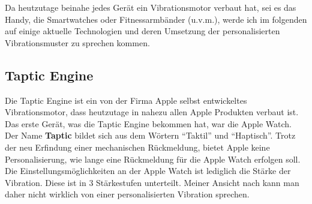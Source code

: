 
Da heutzutage beinahe jedes Ger{\"a}t ein Vibrationsmotor verbaut hat, sei es das Handy, die Smartwatches oder Fitnessarmb{\"a}nder (u.v.m.), werde ich im folgenden auf einige aktuelle Technologien und deren Umsetzung der personalisierten Vibrationsmuster zu sprechen kommen. 

\subsection{Taptic Engine}
\label{ch:Grundlagen:sec:RelatedWork:subsec:TapticEngine}

Die Taptic Engine ist ein von der Firma Apple selbst entwickeltes Vibrationsmotor, dass heutzutage in nahezu allen Apple Produkten verbaut ist. Das erste Ger{\"a}t, was die Taptic Engine bekommen hat, war die Apple Watch. Der Name \textbf{Taptic} bildet sich aus dem W{\"o}rtern "`Taktil"' und "`Haptisch"'. 
Trotz der neu Erfindung einer mechanischen R{\"u}ckmeldung, bietet Apple keine Personalisierung, wie lange eine R{\"u}ckmeldung f{\"u}r die Apple Watch erfolgen soll. Die Einstellungsm{\"o}glichkeiten an der Apple Watch ist lediglich die St{\"a}rke der Vibration. Diese ist in 3 St{\"a}rkestufen unterteilt. Meiner Ansicht nach kann man daher nicht wirklich von einer personalisierten Vibration sprechen. 

